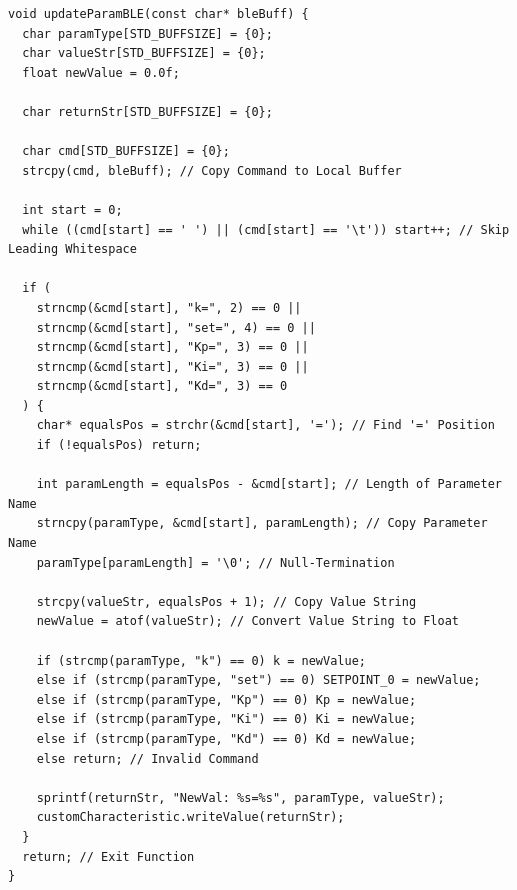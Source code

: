 \documentclass{article}
\begin{document}
\begin{lstlisting}[caption={Arduino BLE PID Tuning}, label={lst:arduino_ble_tuning_code}]
void updateParamBLE(const char* bleBuff) {
  char paramType[STD_BUFFSIZE] = {0};
  char valueStr[STD_BUFFSIZE] = {0};
  float newValue = 0.0f;

  char returnStr[STD_BUFFSIZE] = {0};

  char cmd[STD_BUFFSIZE] = {0};
  strcpy(cmd, bleBuff); // Copy Command to Local Buffer

  int start = 0;
  while ((cmd[start] == ' ') || (cmd[start] == '\t')) start++; // Skip Leading Whitespace

  if (
    strncmp(&cmd[start], "k=", 2) == 0 ||
    strncmp(&cmd[start], "set=", 4) == 0 ||
    strncmp(&cmd[start], "Kp=", 3) == 0 ||
    strncmp(&cmd[start], "Ki=", 3) == 0 ||
    strncmp(&cmd[start], "Kd=", 3) == 0
  ) {
    char* equalsPos = strchr(&cmd[start], '='); // Find '=' Position
    if (!equalsPos) return;

    int paramLength = equalsPos - &cmd[start]; // Length of Parameter Name
    strncpy(paramType, &cmd[start], paramLength); // Copy Parameter Name
    paramType[paramLength] = '\0'; // Null-Termination

    strcpy(valueStr, equalsPos + 1); // Copy Value String
    newValue = atof(valueStr); // Convert Value String to Float

    if (strcmp(paramType, "k") == 0) k = newValue;
    else if (strcmp(paramType, "set") == 0) SETPOINT_0 = newValue;
    else if (strcmp(paramType, "Kp") == 0) Kp = newValue;
    else if (strcmp(paramType, "Ki") == 0) Ki = newValue;
    else if (strcmp(paramType, "Kd") == 0) Kd = newValue;
    else return; // Invalid Command

    sprintf(returnStr, "NewVal: %s=%s", paramType, valueStr);
    customCharacteristic.writeValue(returnStr);
  }
  return; // Exit Function
}
\end{lstlisting}
\end{document}
